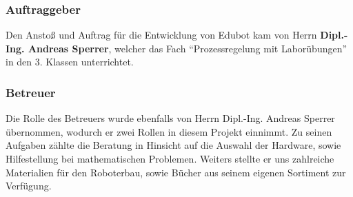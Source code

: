 \subsubsection{Auftraggeber}
Den Anstoß und Auftrag für die Entwicklung von Edubot kam von Herrn \textbf{Dipl.-Ing. Andreas Sperrer}, welcher das Fach “Prozessregelung mit Laborübungen” in den 3. Klassen unterrichtet.

\subsubsection{Betreuer}
Die Rolle des Betreuers wurde ebenfalls von Herrn Dipl.-Ing. Andreas Sperrer übernommen, wodurch er zwei Rollen in diesem Projekt einnimmt. Zu seinen Aufgaben zählte die Beratung in Hinsicht auf die Auswahl der Hardware, sowie Hilfestellung bei mathematischen Problemen. Weiters stellte er uns zahlreiche Materialien für den Roboterbau, sowie Bücher aus seinem eigenen Sortiment zur Verfügung.

